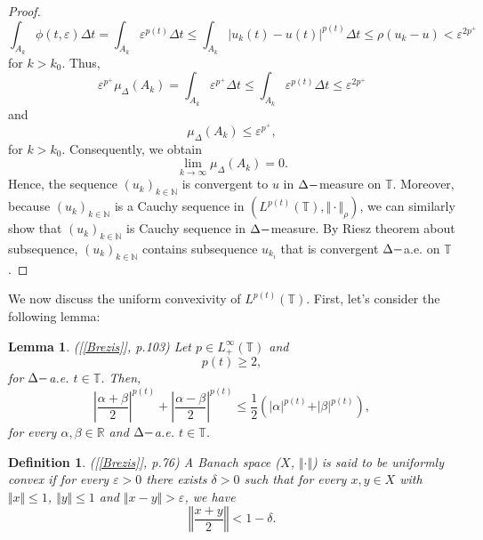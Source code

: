 \documentclass[12pt,a4paper,oneside,titlepage]{article}
\newtheorem{Def}{Definition}
\newtheorem{Lemat}{Lemma}
\renewcommand{\epsilon}{\varepsilon}
\begin{document}
\begin{proof}
\begin{equation}
 \int_{A_k} \phi (t, \epsilon) \Delta t = \int_{A_k} \epsilon^{p(t)} \Delta t \leq \int_{A_k}  \vert u_k (t) - u(t) \vert^{p(t)} \Delta t \leq   \rho(u_k-u) <   \epsilon^{2p^+}
\end{equation} 
for $k>k_0.$ Thus,
\begin{equation}
\nonumber
 \epsilon^{p^+} \mu_{\Delta} (A_k)  =  \int_{A_k} \epsilon^{p^+} \Delta t  \leq \int_{A_k} \epsilon^{p(t)} \Delta t    \leq \epsilon^{2p^+}
\end{equation}
and 
\begin{equation}
\nonumber
\mu_{\Delta} (A_k)\leq \epsilon^{p^+},
\end{equation}
for $k>k_0$.
Consequently, we obtain
\begin{equation}
\nonumber
 \lim_{k \rightarrow \infty} \mu_{\Delta}(A_k) = 0.
\end{equation} 
Hence, the sequence $(u_k)_{k \in \mathbb{N}}$ is convergent to $u$ in $\Delta \-- $measure on $\mathbb{T}$. Moreover, because $(u_k)_{k \in \mathbb{N}}$ is a Cauchy sequence in $(L^{p(t)}(\mathbb{T}), \Vert \cdot \Vert_{\rho})$, we can similarly show that $(u_k)_{k \in \mathbb{N}}$ is Cauchy sequence in $\Delta \-- $measure. By Riesz theorem about subsequence, $(u_k)_{k \in \mathbb{N}}$ contains  subsequence $u_{k_i}$ that is convergent  $\Delta \-- $a.e. on $\mathbb{T}$. 
\end{proof}








We now discuss the uniform convexivity of $L^{p(t)}(\mathbb{T})$. First, let's consider the following lemma:
\begin{Lemat} ([\ref{Brezis}], p.103)
\label{jednostajna_wypuklosc}
Let $p \in L^{ \infty}_{+}(\mathbb{T})$ and 
\begin{equation}
p(t) \geq 2,
\end{equation}
for $\Delta \-- $a.e. $t \in \mathbb{T}$. Then,
\begin{equation}
\left\vert \frac{\alpha+ \beta}{2} \right\vert^{p(t)} + \left\vert \frac{\alpha - \beta}{2} \right\vert^{p(t)} \leq \frac{1}{2} \left( \vert \alpha \vert^{p(t)} + \vert \beta \vert^{p(t)} \right),
\end{equation}
for every $\alpha, \beta \in \mathbb{R}$ and $\Delta \-- $a.e. $t \in \mathbb{T}$.
\end{Lemat}

\begin{Def}([\ref{Brezis}], p.76) A Banach space ($X$, $\Vert \cdot \Vert$) is said to be uniformly convex if for every $\epsilon >0$ there exists $\delta >0$ such that  for every $x,y \in X$ with $\Vert x \Vert \leq 1 $, $\Vert y \Vert \leq 1$ and $\Vert x-y \Vert > \epsilon $, we have
\begin{equation}
\nonumber
\left\Vert \frac{x+y}{2} \right\Vert < 1 - \delta . 
\end{equation}
\end{Def}
\end{document}
